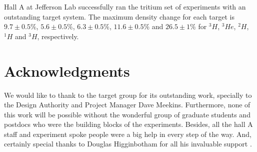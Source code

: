 \documentclass[final,5p,times,twocolumn]{elsarticle}
\begin{document}
Hall A at Jefferson Lab successfully ran the tritium set of experiments with an outstanding target system.  The maximum density change for each target is $9.7 \pm 0.5 \%$, $5.6 \pm 0.5\% $, $6.3 \pm 0.5\% $, $11.6\pm 0.5\% $ and $26.5 \pm 1 \%$ for $^{3}H$, $^{3}He$, $^{2}H$, $^{1}H$ and $^{3}H$, respectively. 



\section{Acknowledgments}
We would like to thank to the target group for its outstanding work, specially to the Design Authority and Project Manager Dave Meekins. Furthermore, none of this work will be possible without the wonderful group of graduate students and postdocs who were the building blocks of the experiments. Besides, all the hall A staff and experiment spoke people were a big help in every step of the way. And, certainly special thanks to Douglas Higginbotham for all his invaluable support . 


 

\end{document}
